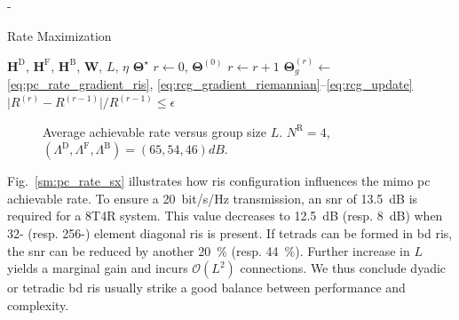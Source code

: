 \documentclass[journal]{IEEEtran}
\makeatletter
\newcommand\setalgorithmcaptionfont[1]{%
	\let\my@floatc@ruled\floatc@ruled          %
	\def\floatc@ruled{%
		\global\let\floatc@ruled\my@floatc@ruled %
		#1\floatc@ruled}}
\makeatother
\begin{document}
\begin{section}{-}
\begin{subsection}{Rate Maximization}
		\setalgorithmcaptionfont{\small}
		\begin{algorithm}[!t]
			\small
			\caption{\gls{rcg} Method for \gls{ris} \gls{mimo}-\gls{pc} Rate Maximization}
			\label{ag:pc_rate_ris}
			\begin{algorithmic}[1]
				\Require $\mathbf{H}^\mathrm{D}$, $\mathbf{H}^\mathrm{F}$, $\mathbf{H}^\mathrm{B}$, $\mathbf{W}$, $L$, $\eta$
				\Ensure $\mathbf{\Theta}^\star$
				\State $r \gets 0$, $\mathbf{\Theta}^{(0)}$
				\Repeat
					\State $r \gets r+1$
						\State $\mathbf{\Theta}_g^{(r)} \gets$ \eqref{eq:pc_rate_gradient_ris}, \eqref{eq:rcg_gradient_riemannian}--\eqref{eq:rcg_update}
					\EndFor
				\Until $\lvert R^{(r)} - R^{(r-1)} \rvert / R^{(r-1)} \le \epsilon$
			\end{algorithmic}
		\end{algorithm}

		\begin{figure}[!t]
			\centering
			\subfloat[\gls{ris} Elements, $N^\mathrm{T} = 8$\label{sm:pc_rate_sx}]{
				\resizebox{0.48\columnwidth}{!}{
					
				}
			}
			\subfloat[Transmit Antenna, $N^\mathrm{S} = 256$\label{sm:pc_rate_tx}]{
				\resizebox{0.48\columnwidth}{!}{
					
				}
			}
			\caption{Average achievable rate versus group size $L$. $N^\mathrm{R} = 4$, $(\Lambda^\mathrm{D}, \Lambda^\mathrm{F}, \Lambda^\mathrm{B}) = (65, 54, 46) \unit{dB}$.}
			\label{sm:pc_rate}
		\end{figure}

		Fig.~\ref{sm:pc_rate_sx} illustrates how \gls{ris} configuration influences the \gls{mimo} \gls{pc} achievable rate.
		To ensure a \qty{20}{bit/s/Hz} transmission, an \gls{snr} of \qty{13.5}{\dB} is required for a 8T4R system.
		This value decreases to \qty{12.5}{\dB} (resp. \qty{8}{\dB}) when 32- (resp. 256-) element diagonal \gls{ris} is present.
		If tetrads can be formed in \gls{bd} \gls{ris}, the \gls{snr} can be reduced by another \qty{20}{\percent} (resp. \qty{44}{\percent}).
		Further increase in $L$ yields a marginal gain and incurs $\mathcal{O}(L^2)$ connections.
		We thus conclude dyadic or tetradic \gls{bd} \gls{ris} usually strike a good balance between performance and complexity.
	\end{subsection}


\end{section}
\end{document}
